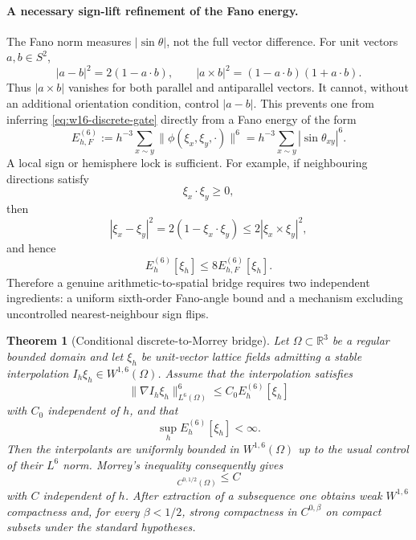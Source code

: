 \documentclass{article}
\newtheorem{theorem}{Theorem}[section]
\begin{document}
\paragraph{A necessary sign-lift refinement of the Fano energy.}
The Fano norm measures $|\sin\theta|$, not the full vector difference.  For
unit vectors $a,b\in S^2$,
\begin{equation}
|a-b|^2=2(1-a\cdot b),
\qquad
|a\times b|^2=(1-a\cdot b)(1+a\cdot b).
\end{equation}
Thus $|a\times b|$ vanishes for both parallel and antiparallel vectors.  It
cannot, without an additional orientation condition, control $|a-b|$.  This
prevents one from inferring \eqref{eq:w16-discrete-gate} directly from a Fano
energy of the form
\begin{equation}
E_{h,F}^{(6)}
:=h^{-3}\sum_{x\sim y}
\|\phi(\xi_x,\xi_y,\cdot)\|^6
=h^{-3}\sum_{x\sim y}|\sin\theta_{xy}|^6.
\end{equation}
A local sign or hemisphere lock is sufficient.  For example, if neighbouring
directions satisfy
\begin{equation}
\xi_x\cdot\xi_y\ge0,
\label{eq:hemisphere-lock}
\end{equation}
then
\begin{equation}
|\xi_x-\xi_y|^2
=2(1-\xi_x\cdot\xi_y)
\le2|\xi_x\times\xi_y|^2,
\end{equation}
and hence
\begin{equation}
E_h^{(6)}[\xi_h]\le 8E_{h,F}^{(6)}[\xi_h].
\end{equation}
Therefore a genuine arithmetic-to-spatial bridge requires two independent
ingredients: a uniform sixth-order Fano-angle bound and a mechanism excluding
uncontrolled nearest-neighbour sign flips.

\begin{theorem}[Conditional discrete-to-Morrey bridge]
Let $\Omega\subset\mathbb R^3$ be a regular bounded domain and let $\xi_h$ be
unit-vector lattice fields admitting a stable interpolation
$I_h\xi_h\in W^{1,6}(\Omega)$.  Assume that the interpolation satisfies
\begin{equation}
\|\nabla I_h\xi_h\|_{L^6(\Omega)}^6
\le C_0 E_h^{(6)}[\xi_h]
\end{equation}
with $C_0$ independent of $h$, and that
\begin{equation}
\sup_h E_h^{(6)}[\xi_h]<\infty.
\end{equation}
Then the interpolants are uniformly bounded in $W^{1,6}(\Omega)$ up to the
usual control of their $L^6$ norm.  Morrey's inequality consequently gives
\begin{equation}
[I_h\xi_h]_{C^{0,1/2}(\Omega)}\le C
\end{equation}
with $C$ independent of $h$.  After extraction of a subsequence one obtains
weak $W^{1,6}$ compactness and, for every $\beta<1/2$, strong compactness in
$C^{0,\beta}$ on compact subsets under the standard hypotheses.
\end{theorem}
\end{document}
